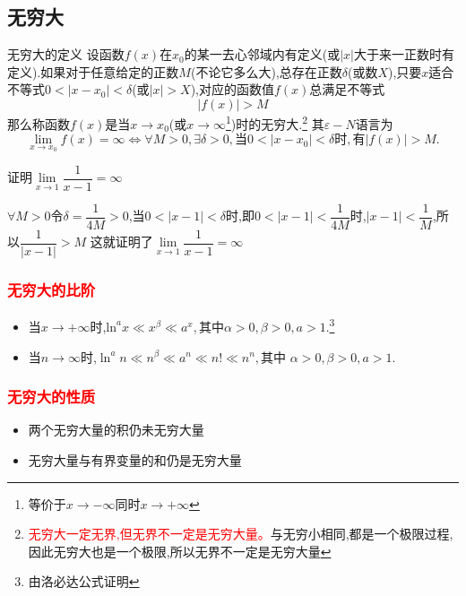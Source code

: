 \documentclass[8pt a4paper, oneside, UTF8]{ctexbook}
\begin{document}
\begin{sloppypar}
    \subsection{无穷大}
    \begin{defn}{无穷大的定义}{}
        设函数$f(x)$在$x_0$的某一去心邻域内有定义(或$|x|$大于来一正数时有定义).如果对于任意给定的正数$M$(不论它多么大),总存在正数$\delta$(或数$X$),只要$x$适合不等式$0<|x-x_0|<\delta$(或$|x|>X$),对应的函数值$f(x)$总满足不等式
        $$
            |f(x)|>M
        $$
        那么称函数$f(x)$是当$x\to x_0$(或$x\to\infty$\footnote{等价于$x \to -\infty$同时$x \to +\infty$})时的无穷大.\footnote{\textcolor{red}{无穷大一定无界,但无界不一定是无穷大量。}与无穷小相同,都是一个极限过程,因此无穷大也是一个极限,所以无界不一定是无穷大量}
        其$\varepsilon-N$语言为
        $$
            \lim\limits_{x\to x_0}f(x)= \infty \Leftrightarrow\forall M >0,\exists\delta>0,\text{当}0<|x-x_0|<\delta\text{时},\text{有}|f(x)|>M.
        $$
    \end{defn}
    \begin{problem}
    证明$\underset{x\rightarrow1}{\operatorname*{lim}}\dfrac{1}{x-1}=\infty $
    \end{problem}
    \begin{solution}
        $\forall M>0$令$\delta=\dfrac{1}{4M}>0$,当$0<|x-1|<\delta$时,即$0<|x-1|<\dfrac{1}{4M}$时,$|x-1|<\dfrac{1}{M}$,所以$\dfrac{1}{|x-1|}>M$
        这就证明了$\underset{x\rightarrow1}{\operatorname*{lim}}\dfrac{1}{x-1}=\infty$
    \end{solution}
    \subsubsection{\textcolor{red}{无穷大的比阶}}
    \begin{itemize}
        \item 当$x \to +\infty$时,$\mathrm{ln}^ax\ll x^\beta\ll a^x,\text{其中}\alpha>0,\beta>0,a>1.$\footnote{由洛必达公式证明}
        \item 当$n \to \infty$时,$\ln^an\ll n^\beta\ll a^n\ll n!\ll n^n,\text{其中 }\alpha>0,\beta>0,a>1.$
    \end{itemize}
    \subsubsection{\textcolor{red}{无穷大的性质}}
    \begin{itemize}
        \item 两个无穷大量的积仍未无穷大量
        \item 无穷大量与有界变量的和仍是无穷大量
    \end{itemize}

\end{sloppypar}
\end{document}
